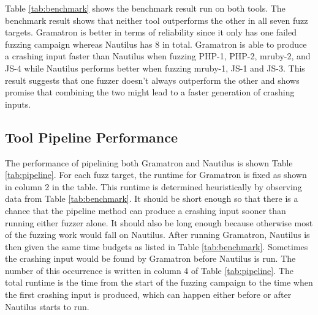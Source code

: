 Table \ref{tab:benchmark} shows the benchmark result run on both tools. The benchmark result shows that neither tool outperforms the other in all seven fuzz targets. Gramatron is better in terms of reliability since it only has one failed fuzzing campaign whereas Nautilus has 8 in total. Gramatron is able to produce a crashing input faster than Nautilus when fuzzing PHP-1, PHP-2, mruby-2, and JS-4 while Nautilus performs better when fuzzing mruby-1, JS-1 and JS-3. This result suggests that one fuzzer doesn't always outperform the other and shows promise that combining the two might lead to a faster generation of crashing inputs.

\subsection{Tool Pipeline Performance}
The performance of pipelining both Gramatron and Nautilus is shown Table \ref{tab:pipeline}. For each fuzz target, the runtime for Gramatron is fixed as shown in column 2 in the table. This runtime is determined heuristically by observing data from Table \ref{tab:benchmark}. It should be short enough so that there is a chance that the pipeline method can produce a crashing input sooner than running either fuzzer alone. It should also be long enough because otherwise most of the fuzzing work would fall on Nautilus. After running Gramatron, Nautilus is then given the same time budgets as listed in Table \ref{tab:benchmark}. Sometimes the crashing input would be found by Gramatron before Nautilus is run. The number of this occurrence is written in column 4 of Table \ref{tab:pipeline}. The total runtime is the time from the start of the fuzzing campaign to the time when the first crashing input is produced, which can happen either before or after Nautilus starts to run. 
